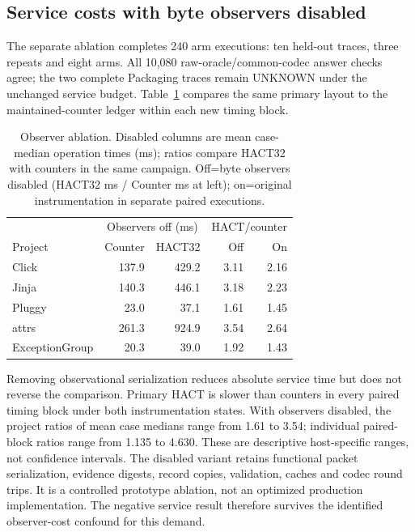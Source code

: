 \subsection{Service costs with byte observers disabled}
The separate ablation completes 240 arm executions: ten held-out traces,
three repeats and eight arms. All 10,080 raw-oracle/common-codec answer
checks agree; the two complete Packaging traces remain UNKNOWN under the
unchanged service budget. Table~\ref{tab:v12-observer} compares the same
primary layout to the maintained-counter ledger within each new timing block.

\begin{table}[t]\centering\footnotesize
\caption{Observer ablation. Disabled columns are mean case-median operation
times (ms); ratios compare HACT32 with counters in the same campaign.
Off=byte observers disabled (HACT32 ms / Counter ms at left);
on=original instrumentation in separate paired executions.}
\label{tab:v12-observer}
\begin{tabular}{@{}lrrrr@{}}\toprule
& \multicolumn{2}{c}{Observers off (ms)} & \multicolumn{2}{c}{HACT/counter}\\
Project & Counter & HACT32 & Off & On\\\midrule
Click & 137.9 & 429.2 & 3.11 & 2.16 \\
Jinja & 140.3 & 446.1 & 3.18 & 2.23 \\
Pluggy & 23.0 & 37.1 & 1.61 & 1.45 \\
attrs & 261.3 & 924.9 & 3.54 & 2.64 \\
ExceptionGroup & 20.3 & 39.0 & 1.92 & 1.43 \\
\bottomrule\end{tabular}\end{table}

Removing observational serialization reduces absolute service time but
does not reverse the comparison. Primary HACT is slower than counters
in every paired timing block under both instrumentation states. With
observers disabled, the project ratios of mean case medians range from
1.61 to 3.54; individual paired-block ratios range from
1.135 to 4.630. These are descriptive host-specific
ranges, not confidence intervals. The disabled variant retains functional
packet serialization, evidence digests, record copies, validation, caches
and codec round trips. It is a controlled prototype ablation, not an optimized
production implementation. The negative service result therefore survives
the identified observer-cost confound for this demand.

